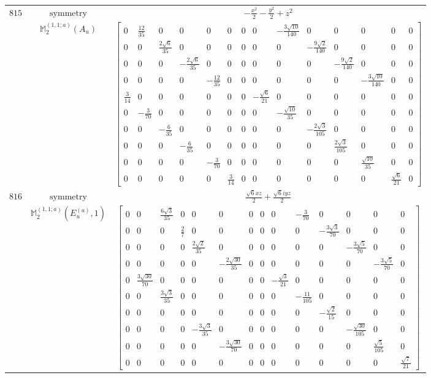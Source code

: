 \documentclass[fleqn,8pt,landscape]{jsarticle}
\begin{document}
\begin{longtable}{ccc}
$ 815 $ & $ \text{symmetry} $ & $ - \frac{x^{2}}{2} - \frac{y^{2}}{2} + z^{2} $ \\
$  $ & $ \mathbb{M}_{2}^{(1,1;a)}(A_{u}) $ & $ \begin{bmatrix} 0 & \frac{12}{35} & 0 & 0 & 0 & 0 & 0 & 0 & - \frac{3 \sqrt{10}}{140} & 0 & 0 & 0 & 0 & 0 \\ 0 & 0 & \frac{2 \sqrt{6}}{35} & 0 & 0 & 0 & 0 & 0 & 0 & - \frac{9 \sqrt{2}}{140} & 0 & 0 & 0 & 0 \\ 0 & 0 & 0 & - \frac{2 \sqrt{6}}{35} & 0 & 0 & 0 & 0 & 0 & 0 & - \frac{9 \sqrt{2}}{140} & 0 & 0 & 0 \\ 0 & 0 & 0 & 0 & - \frac{12}{35} & 0 & 0 & 0 & 0 & 0 & 0 & - \frac{3 \sqrt{10}}{140} & 0 & 0 \\ \frac{3}{14} & 0 & 0 & 0 & 0 & 0 & 0 & - \frac{\sqrt{6}}{21} & 0 & 0 & 0 & 0 & 0 & 0 \\ 0 & - \frac{3}{70} & 0 & 0 & 0 & 0 & 0 & 0 & - \frac{\sqrt{10}}{35} & 0 & 0 & 0 & 0 & 0 \\ 0 & 0 & - \frac{6}{35} & 0 & 0 & 0 & 0 & 0 & 0 & - \frac{2 \sqrt{3}}{105} & 0 & 0 & 0 & 0 \\ 0 & 0 & 0 & - \frac{6}{35} & 0 & 0 & 0 & 0 & 0 & 0 & \frac{2 \sqrt{3}}{105} & 0 & 0 & 0 \\ 0 & 0 & 0 & 0 & - \frac{3}{70} & 0 & 0 & 0 & 0 & 0 & 0 & \frac{\sqrt{10}}{35} & 0 & 0 \\ 0 & 0 & 0 & 0 & 0 & \frac{3}{14} & 0 & 0 & 0 & 0 & 0 & 0 & \frac{\sqrt{6}}{21} & 0 \end{bmatrix} $ \\ \hline
$ 816 $ & $ \text{symmetry} $ & $ \frac{\sqrt{6} x z}{2} + \frac{\sqrt{6} i y z}{2} $ \\
$  $ & $ \mathbb{M}_{2}^{(1,1;a)}(E_{u}^{(a)},1) $ & $ \begin{bmatrix} 0 & 0 & \frac{6 \sqrt{3}}{35} & 0 & 0 & 0 & 0 & 0 & 0 & - \frac{3}{70} & 0 & 0 & 0 & 0 \\ 0 & 0 & 0 & \frac{2}{7} & 0 & 0 & 0 & 0 & 0 & 0 & - \frac{3 \sqrt{3}}{70} & 0 & 0 & 0 \\ 0 & 0 & 0 & 0 & \frac{2 \sqrt{2}}{35} & 0 & 0 & 0 & 0 & 0 & 0 & - \frac{3 \sqrt{5}}{70} & 0 & 0 \\ 0 & 0 & 0 & 0 & 0 & - \frac{2 \sqrt{30}}{35} & 0 & 0 & 0 & 0 & 0 & 0 & - \frac{3 \sqrt{5}}{70} & 0 \\ 0 & \frac{3 \sqrt{30}}{70} & 0 & 0 & 0 & 0 & 0 & 0 & - \frac{\sqrt{3}}{21} & 0 & 0 & 0 & 0 & 0 \\ 0 & 0 & \frac{3 \sqrt{3}}{35} & 0 & 0 & 0 & 0 & 0 & 0 & - \frac{11}{105} & 0 & 0 & 0 & 0 \\ 0 & 0 & 0 & 0 & 0 & 0 & 0 & 0 & 0 & 0 & - \frac{\sqrt{2}}{15} & 0 & 0 & 0 \\ 0 & 0 & 0 & 0 & - \frac{3 \sqrt{3}}{35} & 0 & 0 & 0 & 0 & 0 & 0 & - \frac{\sqrt{30}}{105} & 0 & 0 \\ 0 & 0 & 0 & 0 & 0 & - \frac{3 \sqrt{30}}{70} & 0 & 0 & 0 & 0 & 0 & 0 & \frac{\sqrt{5}}{105} & 0 \\ 0 & 0 & 0 & 0 & 0 & 0 & 0 & 0 & 0 & 0 & 0 & 0 & 0 & \frac{\sqrt{7}}{21} \end{bmatrix} $ \\ \hline

\end{longtable}
\end{document}
